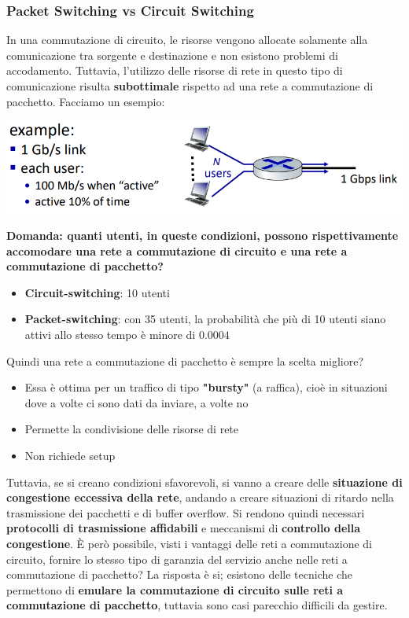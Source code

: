 \documentclass[12pt]{article}
\begin{document}
\subsubsection{Packet Switching vs Circuit Switching}
In una commutazione di circuito, le risorse vengono allocate solamente alla comunicazione tra sorgente e destinazione e non esistono
problemi di accodamento. Tuttavia, l'utilizzo delle risorse di rete in questo tipo di comunicazione risulta \textbf{subottimale} rispetto ad una
rete a commutazione di pacchetto. Facciamo un esempio:
\begin{center}
    \includegraphics[width =0.75\linewidth]{Images/9.PNG}
\end{center}
\textbf{Domanda: quanti utenti, in queste condizioni, possono rispettivamente accomodare una rete a commutazione di circuito e una rete a commutazione di pacchetto?}
\begin{itemize}
    \item \textbf{Circuit-switching}: 10 utenti
    \item \textbf{Packet-switching}: con 35 utenti, la probabilità che più di 10 utenti siano attivi allo stesso tempo è minore di $0.0004$
\end{itemize}
Quindi una rete a commutazione di pacchetto è sempre la scelta migliore?
\begin{itemize}
    \item Essa è ottima per un traffico di tipo \textbf{"bursty"} (a raffica), cioè in situazioni dove a volte ci sono dati da inviare, a volte no
    \item Permette la condivisione delle risorse di rete
    \item Non richiede setup
\end{itemize}
Tuttavia, se si creano condizioni sfavorevoli, si vanno a creare delle \textbf{situazione di congestione eccessiva della rete}, andando a creare situazioni
di ritardo nella trasmissione dei pacchetti e di buffer overflow. Si rendono quindi necessari \textbf{protocolli di trasmissione affidabili} e meccanismi di \textbf{controllo della congestione}.
È però possibile, visti i vantaggi delle reti a commutazione di circuito, fornire lo stesso tipo di garanzia del servizio anche nelle reti a commutazione di pacchetto?
La risposta è si; esistono delle tecniche che permettono di \textbf{emulare la commutazione di circuito sulle reti a commutazione di pacchetto}, tuttavia sono casi parecchio difficili da gestire.
\end{document}
